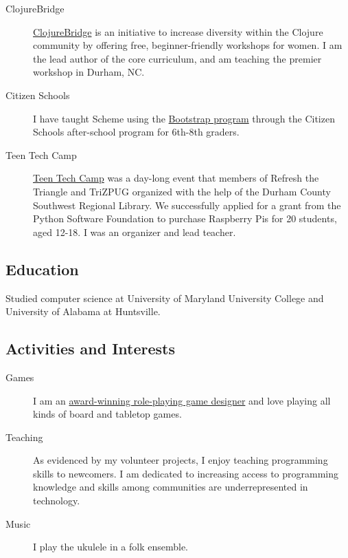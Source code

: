 \begin{description}
\item[ClojureBridge]
\href{http://clojurebridge.org/}{ClojureBridge} is an initiative to
increase diversity within the Clojure community by offering free,
beginner-friendly workshops for women. I am the lead author of the core
curriculum, and am teaching the premier workshop in Durham, NC.
\item[Citizen Schools]
I have taught Scheme using the
\href{http://bootstrapworld.org}{Bootstrap program} through the Citizen
Schools after-school program for 6th-8th graders.
\item[Teen Tech Camp]
\href{http://exitevent.com/teen-tech-camp-hosts-future-developers-1389.asp}{Teen
Tech Camp} was a day-long event that members of Refresh the Triangle and
TriZPUG organized with the help of the Durham County Southwest Regional
Library. We successfully applied for a grant from the Python Software
Foundation to purchase Raspberry Pis for 20 students, aged 12-18. I was
an organizer and lead teacher.
\end{description}

\subsection{Education}\label{education}

Studied computer science at University of Maryland University College
and University of Alabama at Huntsville.

\subsection{Activities and Interests}\label{activities-and-interests}

\begin{description}
\item[Games]
I am an
\href{http://crngames.com/the_shadow_of_yesterday/}{award-winning
role-playing game designer} and love playing all kinds of board and
tabletop games.
\item[Teaching]
As evidenced by my volunteer projects, I enjoy teaching programming
skills to newcomers. I am dedicated to increasing access to programming
knowledge and skills among communities are underrepresented in
technology.
\item[Music]
I play the ukulele in a folk ensemble.
\end{description}
